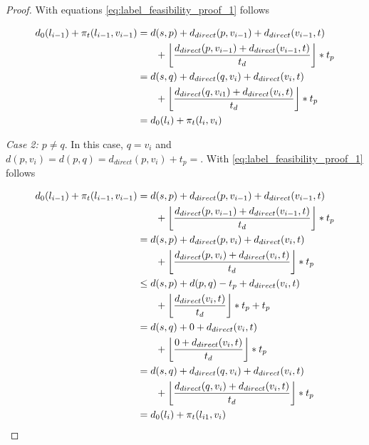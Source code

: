 \begin{proof}
	With equations \ref{eq:label_feasibility_proof_1} follows

	\begin{align}
		\begin{split}\label{eq:label_feasibility_proof_3}
			d_0(l_{i-1}) + \pi_t(l_{i-1},v_{i-1}) &= d(s,p) + d_{direct}(p,v_{i-1}) + d_{direct}(v_{i-1},t)\\
			& \phantom{{}=1} + \floor*{ \frac{d_{direct}(p,v_{i-1}) + d_{direct}(v_{i-1},t)}{t_d} } * t_p\\
			&= d(s,q) + d_{direct}(q,v_{i}) + d_{direct}(v_{i},t)\\
			& \phantom{{}=1} + \floor*{ \frac{d_{direct}(q,v_{i1}) + d_{direct}(v_{i},t)}{t_d} } * t_p\\
			&= d_0(l_{i}) + \pi_t(l_{i},v_{i})
		\end{split}
	\end{align}

	\emph{Case 2: $p \neq q$}. In this case, $q = v_i$ and $d(p,v_i) = d(p,q) = d_{direct}(p,v_i) + t_p = $. With \ref{eq:label_feasibility_proof_1} follows

	\begin{align}
		\begin{split}\label{eq:label_feasibility_proof_4}
			d_0(l_{i-1}) + \pi_t(l_{i-1},v_{i-1}) &= d(s,p) + d_{direct}(p,v_{i-1}) + d_{direct}(v_{i-1},t)\\
			& \phantom{{}=1} + \floor*{ \frac{d_{direct}(p,v_{i-1}) + d_{direct}(v_{i-1},t)}{t_d} } * t_p\\
			&= d(s,p) + d_{direct}(p,v_{i}) + d_{direct}(v_{i},t)\\
			& \phantom{{}=1} + \floor*{ \frac{d_{direct}(p,v_{i}) + d_{direct}(v_{i},t)}{t_d} } * t_p\\
			&\le d(s,p) + d(p,q) - t_p + d_{direct}(v_{i},t)\\
			& \phantom{{}=1} + \floor*{ \frac{d_{direct}(v_{i},t)}{t_d} } * t_p + t_p\\
			&= d(s,q) + 0 + d_{direct}(v_{i},t)\\
			& \phantom{{}=1} + \floor*{ \frac{0 + d_{direct}(v_{i},t)}{t_d} } * t_p\\
			&= d(s,q) + d_{direct}(q,v_{i}) + d_{direct}(v_{i},t)\\
			& \phantom{{}=1} + \floor*{ \frac{d_{direct}(q,v_{i}) + d_{direct}(v_{i},t)}{t_d} } * t_p\\
			&= d_0(l_{i}) + \pi_t(l_{i1},v_{i})
		\end{split}
	\end{align}
\end{proof}

